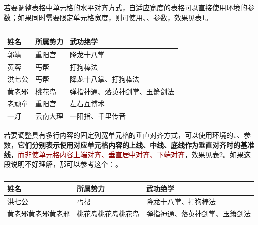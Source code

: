 若要调整表格中单元格的水平对齐方式，自适应宽度的表格可以直接使用环境的参数；如果同时需要限定单元格宽度，则可使用、、参数，效果见表\ref{tab: 单元格三种水平对齐方式}。

\begin{table}
    \caption{} \label{tab: 单元格三种水平对齐方式}
    \begin{tabular}{p{2cm} p{3cm}<{\centering} p{7cm}<{\raggedleft}}
        \toprule
        \textbf{姓名} & \textbf{所属势力} & \textbf{武功绝学} \\
        \midrule
        郭靖 & 重阳宫 & 降龙十八掌 \\
        黄蓉 & 丐帮 & 打狗棒法 \\
        洪七公 & 丐帮 & 降龙十八掌、打狗棒法 \\
        黄老邪 & 桃花岛 & 弹指神通、落英神剑掌、玉箫剑法 \\
        老顽童 & 重阳宫 & 左右互博术 \\
        一灯 & 云南大理 & 一阳指、千里传音 \\
        \bottomrule
    \end{tabular}
\end{table}

若要调整具有多行内容的固定列宽单元格的垂直对齐方式，可以使用环境的、、参数，\textbf{它们分别表示使用对应单元格内容的上线、中线、底线作为垂直对齐时的基准线}，\textcolor{DarkRed}{而非使单元格内容上端对齐、垂直居中对齐、下端对齐}，效果见表\ref{tab: 单元格三种垂直对齐方式}。如果这段说明不好理解，那可以参考这个：\href{https://tex.stackexchange.com/questions/35293}{\ttfamily\color{DarkRed}}。

\begin{table}[!ht]
    \caption{} \label{tab: 单元格三种垂直对齐方式}
    \begin{tabular}{p{2cm} b{2cm} m{2cm}}
        \toprule
        \textbf{姓名} & \textbf{所属势力} & \textbf{武功绝学} \\
        \midrule
        洪七公 & 丐帮 & 降龙十八掌、打狗棒法 \\
        黄老邪黄老邪黄老邪 & 桃花岛桃花岛桃花岛 & 弹指神通、落英神剑掌、玉箫剑法 \\
        \bottomrule
    \end{tabular}
\end{table}

